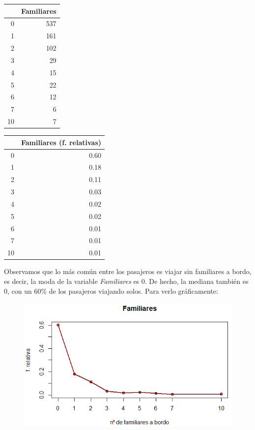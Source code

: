\documentclass{article}
\begin{document}
\begin{table}[htbp]
    \centering
    \begin{minipage}{.5\textwidth}
        \centering
        \begin{tabular}{rr}
          \hline
         & Familiares \\ 
          \hline
        0 & 537 \\ 
          1 & 161 \\ 
          2 & 102 \\ 
          3 &  29 \\ 
          4 &  15 \\ 
          5 &  22 \\ 
          6 &  12 \\ 
          7 &   6 \\ 
          10 &   7 \\ 
           \hline
        \end{tabular}
    \end{minipage}%
    \begin{minipage}{.5\textwidth}
        \centering
        \begin{tabular}{rr}
          \hline
         & Familiares (f. relativas)\\ 
          \hline
        0 & 0.60 \\ 
          1 & 0.18 \\ 
          2 & 0.11 \\ 
          3 & 0.03 \\ 
          4 & 0.02 \\ 
          5 & 0.02 \\ 
          6 & 0.01 \\ 
          7 & 0.01 \\ 
          10 & 0.01 \\ 
           \hline
        \end{tabular}
    \end{minipage}
\end{table}

\noindent Observamos que lo más común entre los pasajeros es viajar sin familiares a bordo, es decir, la moda de la variable \textit{Familiares} es 0. De hecho, la mediana también es 0, con un 60\% de los pasajeros viajando solos. Para verlo gráficamente:

\begin{figure}[!h]
    \centering
    \includegraphics[width=0.7\linewidth]{content/diag_fam.png}
\end{figure}
\end{document}

